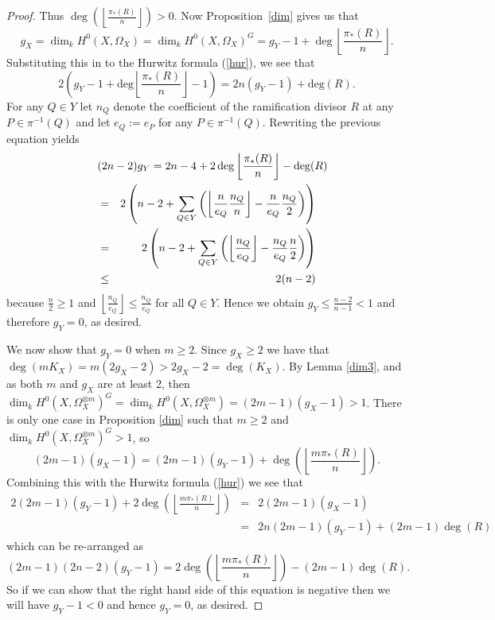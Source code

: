 \documentclass[11pt]{article} %
\theoremstyle{remark}\newtheorem*{rem}{Remark}
\begin{document}
\begin{proof}
    Thus $\deg\left( \left\lfloor \frac{\pi_*(R)}{n} \right\rfloor \right) >0$. 
    Now Proposition~\ref{dim} gives us that
      \begin{equation*}
	g_X=\dim_k H^0(X,\Omega_X)=\dim_k H^0(X,\Omega_X)^G= g_Y-1+\deg\left\lfloor \frac{\pi_*(R)}{n} \right\rfloor.
      \end{equation*}
    Substituting this in to the Hurwitz formula (\ref{hur}), we see that
      \begin{equation*}
	2\left(g_Y - 1 + \textrm{deg}\left \lfloor \frac{\pi_*(R)}{n} \right \rfloor -1 \right) = 2n (g_Y -1) + \textrm{deg}(R).
      \end{equation*}
    For any $Q \in Y$ let $n_Q$ denote the coefficient of the ramification divisor $R$ at any $P \in \pi^{-1}(Q)$ and let $e_Q := e_P$ for any $P \in \pi^{-1}(Q)$. 
    Rewriting the previous equation yields
      \begin{eqnarray*}
	\lefteqn{(2n-2)g_Y = 2n-4 + 2 \,\textrm{deg}\left \lfloor \frac{\pi_*(R)}{n}\right \rfloor - \textrm{deg}(R)}\\
	&=& 2 \left(n-2 + \sum_{Q \in Y} \left(\left\lfloor \frac{n}{e_Q} \frac{n_Q}{n} \right\rfloor - \frac{n}{e_Q} \frac{n_Q}{2}\right) \right)\\
	&=& 2 \left(n-2 + \sum_{Q \in Y} \left( \left\lfloor \frac{n_Q}{e_Q} \right\rfloor - \frac{n_Q}{e_Q} \frac{n}{2} \right)\right)\\
	& \le & 2(n-2)
      \end{eqnarray*}
    because $\frac{n}{2} \ge 1$ and $\left\lfloor \frac{n_Q}{e_Q}\right\rfloor \le \frac{n_Q}{e_Q}$ for all $Q \in Y$. 
    Hence we obtain $g_Y \le \frac{n-2}{n-1} < 1$ and therefore $g_Y =0$, as desired.

    We now show that $g_Y=0$ when $m\geq 2$. 
    Since $g_X\geq 2$ we have that $\deg(mK_X)=m(2g_X-2)>2g_X-2=\deg(K_X)$.
    By Lemma \ref{dim3}, and as both $m$ and $g_X$ are at least 2, then $\dim_kH^0(X,\Omega_X^{\otimes m})^G=\dim_kH^0(X,\Omega_X^{\otimes m})=(2m-1)(g_X-1)>1$.
    There is only one case in Proposition \ref{dim} such that $m\geq 2$ and $\dim_k H^0(X,\Omega_X^{\otimes m})^G>1$, so 
      \begin{equation*}
	(2m-1)(g_X-1)=(2m-1)(g_Y-1)+\deg\left(\left\lfloor \frac{m\pi_*(R)}{n} \right\rfloor \right).
      \end{equation*}
    Combining this with the Hurwitz formula (\ref{hur}) we see that
      \begin{eqnarray*}
	2(2m-1)(g_Y-1)+2\deg\left(\left\lfloor\frac{m\pi_*(R)}{n}\right\rfloor\right) & = & 2(2m-1)(g_X-1)\\
	& = & 2n(2m-1)(g_Y-1)+(2m-1)\deg(R)
      \end{eqnarray*}
    which can be re-arranged as
      \begin{equation*}
	(2m-1)(2n-2)(g_Y-1)=2\deg\left(\left\lfloor\frac{m\pi_*(R)}{n}\right\rfloor\right)-(2m-1)\deg(R).
      \end{equation*}
    So if we can show that the right hand side of this equation is negative then we will have $g_Y-1<0$ and hence $g_Y=0$, as desired.


\end{proof}
\end{document}
